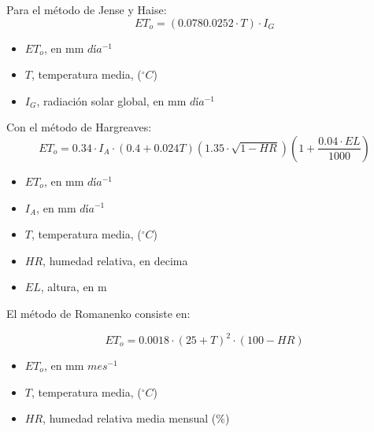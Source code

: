         Para el método de Jense y Haise:
        \begin{equation}
            ET_o = \left(0.078 0.0252 \cdot  T\right) \cdot I_G
        \end{equation}
        \begin{notation}
            \begin{itemize}
                \item $ET_o$, en mm $día^{-1}$
                \item $T$, temperatura media, ($^{\circ}C$)
                \item $I_G$, radiación solar global, en mm $día^{-1}$
                \end{itemize}
        \end{notation}
        
        Con el método de Hargreaves:
        \begin{equation}
            ET_o = 0.34 \cdot I_A \cdot \left(0.4+0.024T \right)\left(1.35 \cdot \sqrt{1 -HR} \right)\left(1 +\frac{0.04 \cdot EL}{1000}\right)
        \end{equation}
        \begin{notation}
            \begin{itemize}
                \item $ET_o$, en mm $día^{-1}$
                \item $I_A$, en mm $día^{-1}$
                \item $T$, temperatura media, ($^{\circ}C$)
                \item $HR$,  humedad relativa, en decima
                \item $EL$, altura, en m
                \end{itemize}
        \end{notation}
        
        El método de Romanenko consiste en:
        
        \begin{equation}
            ET_o =0.0018 \cdot (25 +T)^2 \cdot (100-HR)
        \end{equation}
        \begin{notation}
            \begin{itemize}
                \item $ET_o$, en mm $mes^{-1}$
                \item $T$, temperatura media, ($^{\circ}C$)
                \item $HR$, humedad relativa media mensual (\%)
            \end{itemize}
        \end{notation}
        
